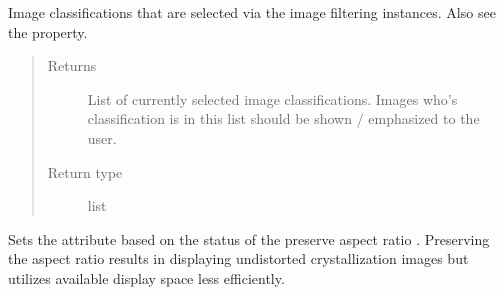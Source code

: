 \documentclass[letterpaper,10pt,english]{sphinxmanual}
\begin{document}
\begin{fulllineitems}

\begin{fulllineitems}
\label{\detokenize{polo.widgets:polo.widgets.plate_inspector_widget.PlateInspectorWidget.selected_classifications}}
Image classifications that are
selected via the image filtering  instances. Also see the
 property.
\begin{quote}\begin{description}
\item[{Returns}] \leavevmode
List of currently selected image classifications. Images
who’s classification is in this list should be shown / 
emphasized to the user.

\item[{Return type}] \leavevmode
list

\end{description}\end{quote}

\end{fulllineitems}


\begin{fulllineitems}
\label{\detokenize{polo.widgets:polo.widgets.plate_inspector_widget.PlateInspectorWidget.set_aspect_ratio_mode}}
Sets the  attribute based on the status of
the preserve aspect ratio . Preserving the 
aspect ratio results in displaying undistorted crystallization images 
but utilizes available display space less efficiently.

\end{fulllineitems}



\end{fulllineitems}
\end{document}
